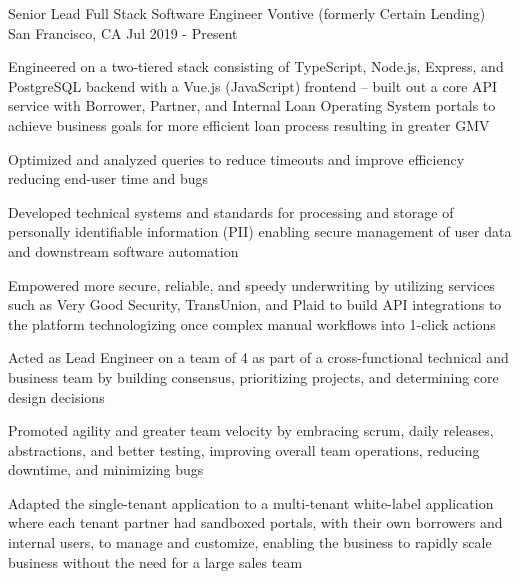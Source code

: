 






\begin{cventries}

  \cventry
     {Senior Lead Full Stack Software Engineer}
     {Vontive (formerly Certain Lending)}
     {San Francisco, CA}
     {Jul 2019 - Present}
     {
       \begin{cvitems}
			\item{Engineered on a two-tiered stack consisting of TypeScript, Node.js, Express, and PostgreSQL backend with a Vue.js (JavaScript) frontend -- built out a core API service with Borrower, Partner, and Internal Loan Operating System portals to achieve business goals for more efficient loan process resulting in greater GMV}
			\item{Optimized and analyzed queries to reduce timeouts and improve efficiency reducing end-user time and bugs}
			\item{Developed technical systems and standards for processing and storage of personally identifiable information (PII) enabling secure management of user data and downstream software automation}
			\item{Empowered more secure, reliable, and speedy underwriting by utilizing services such as Very Good Security, TransUnion, and Plaid to build API integrations to the platform technologizing once complex manual workflows into 1-click actions}
   		\item{Acted as Lead Engineer on a team of 4 as part of a cross-functional technical and business team by building consensus, prioritizing projects, and determining core design decisions}
  		\item{Promoted agility and greater team velocity by embracing scrum, daily releases, abstractions, and better testing, improving overall team operations, reducing downtime, and minimizing bugs}
   		\item{Adapted the single-tenant application to a multi-tenant white-label application where each tenant partner had sandboxed portals, with their own borrowers and internal users, to manage and customize, enabling the business to rapidly scale business without the need for a large sales team}

\end{cvitems}}
\end{cventries}
